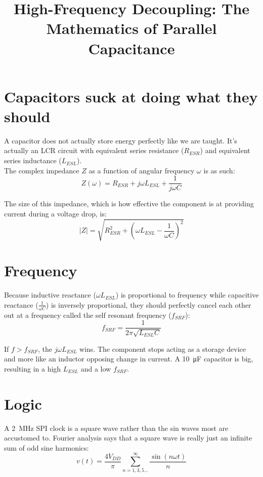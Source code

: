 \documentclass{article}
\title{High-Frequency Decoupling: The Mathematics of Parallel Capacitance}
\author{}
\date{}
\begin{document}
\maketitle
\section{Capacitors suck at doing what they should}
A capacitor does not actually store energy perfectly like we are taught. It's actually an LCR circuit with equivalent series resistance ($R_{ESR}$) and equivalent series inductance ($L_{ESL}$).\\

The complex impedance $Z$ as a function of angular frequency $\omega$ is as such:
\begin{equation}
    Z(\omega) = R_{ESR} + j\omega L_{ESL} + \frac{1}{j\omega C}
\end{equation}

The size of this impedance, which is how effective the component is at providing current during a voltage drop, is:
\begin{equation}
    |Z| = \sqrt{R_{ESR}^2 + \left(\omega L_{ESL} - \frac{1}{\omega C}\right)^2}
\end{equation}

\section{Frequency}
Because inductive reactance ($\omega L_{ESL}$) is proportional to frequency while capacitive reactance ($\frac{1}{\omega C}$) is inversely proportional, they should perfectly cancel each other out at a frequency called the self resonant frequency ($f_{SRF}$):
\begin{equation}
    f_{SRF} = \frac{1}{2\pi\sqrt{L_{ESL} C}}
\end{equation}

If $f > f_{SRF}$, the $j\omega L_{ESL}$ wins. The component stops acting as a storage device and more like an inductor opposing change in current. A \SI{10}{\micro\farad} capacitor is big, resulting in a high $L_{ESL}$ and a low $f_{SRF}$.

\section{Logic}
A \SI{2}{\mega\hertz} SPI clock is a square wave rather than the sin waves most are accustomed to. Fourier analysis says that a square wave is really just an infinite sum of odd sine harmonics:
\begin{equation}
    v(t) = \frac{4V_{DD}}{\pi} \sum_{n=1,3,5\dots}^{\infty} \frac{\sin(n \omega t)}{n}
\end{equation}
\end{document}
